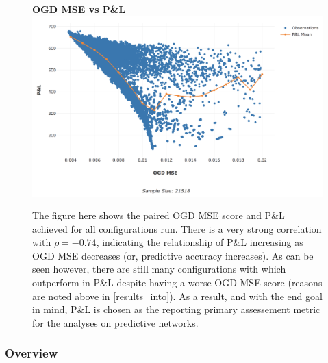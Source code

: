 \documentclass[a4paper,11pt,oneside]{article}
\theoremstyle{plain}
\theoremstyle{definition}
\begin{document}
		\begin{figure}[H]
		\textbf{OGD MSE vs P\&L}
		\centering
		\includegraphics[scale=0.45]{images/results/intro/ogdmse_pl.png}
		\caption[OGD MSE vs P\&L]
					{The figure here shows the paired OGD MSE score and P\&L achieved for all configurations run. There is a very strong correlation with $\rho = -0.74$, indicating the relationship of P\&L increasing as OGD MSE decreases (or, predictive accuracy increases). As can be seen however, there are still many configurations with which outperform in P\&L despite having a worse OGD MSE score (reasons are noted above in \ref{results_into}). As a result, and with the end goal in mind, P\&L is chosen as the reporting primary assessement metric for the analyses on predictive networks. }
		\label{figure-ogdmse_pl}
	\end{figure}
	
	\subsubsection{Overview}
	
\end{document}
